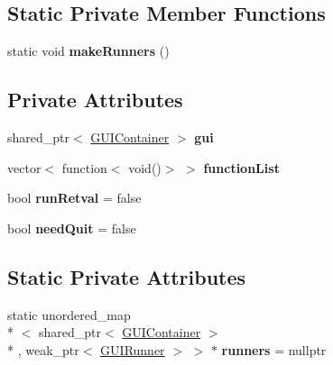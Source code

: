 \subsection*{Static Private Member Functions}
\begin{DoxyCompactItemize}
\item 
\hypertarget{classGUIRunner_a41c80c195e9dd4309df502f3427b1d36}{static void {\bfseries make\+Runners} ()}\label{classGUIRunner_a41c80c195e9dd4309df502f3427b1d36}

\end{DoxyCompactItemize}
\subsection*{Private Attributes}
\begin{DoxyCompactItemize}
\item 
\hypertarget{classGUIRunner_ad60838d742eaccba8a58b135f752621d}{shared\+\_\+ptr$<$ \hyperlink{classGUIContainer}{G\+U\+I\+Container} $>$ {\bfseries gui}}\label{classGUIRunner_ad60838d742eaccba8a58b135f752621d}

\item 
\hypertarget{classGUIRunner_a2cc56b998bbe4e30c760146648d7dee8}{vector$<$ function$<$ void()$>$ $>$ {\bfseries function\+List}}\label{classGUIRunner_a2cc56b998bbe4e30c760146648d7dee8}

\item 
\hypertarget{classGUIRunner_a19cbe217b41b144355edbcda2f482680}{bool {\bfseries run\+Retval} = false}\label{classGUIRunner_a19cbe217b41b144355edbcda2f482680}

\item 
\hypertarget{classGUIRunner_a2cec6973d0f9e098dbfdf1849b36b3f0}{bool {\bfseries need\+Quit} = false}\label{classGUIRunner_a2cec6973d0f9e098dbfdf1849b36b3f0}

\end{DoxyCompactItemize}
\subsection*{Static Private Attributes}
\begin{DoxyCompactItemize}
\item 
\hypertarget{classGUIRunner_adeced5f9556e581c711ffef78b992356}{static unordered\+\_\+map\\*
$<$ shared\+\_\+ptr$<$ \hyperlink{classGUIContainer}{G\+U\+I\+Container} $>$\\*
, weak\+\_\+ptr$<$ \hyperlink{classGUIRunner}{G\+U\+I\+Runner} $>$ $>$ $\ast$ {\bfseries runners} = nullptr}\label{classGUIRunner_adeced5f9556e581c711ffef78b992356}

\end{DoxyCompactItemize}


